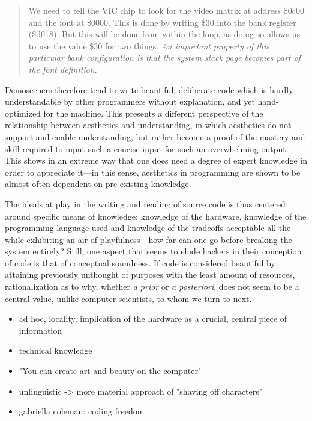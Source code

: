 \begin{quote}
  We need to tell the VIC chip to look for the video matrix at address \$0c00 and the font at \$0000. This is done by writing \$30 into the bank register (\$d018). But this will be done from within the loop, as doing so allows us to use the value \$30 for two things. \emph{An important property of this particular bank configuration is that the system stack page becomes part of the font definition}.
\end{quote}

Demosceners therefore tend to write beautiful, deliberate code which is hardly understandable by other programmers without explanation, and yet hand-optimized for the machine. This presents a different perspective of the relationship between aesthetics and understanding, in which aesthetics do not support and enable understanding, but rather become a proof of the mastery and skill required to input such a concise input for such an overwhelming output. This shows in an extreme way that one does need a degree of expert knowledge in order to appreciate it—in this sense, aesthetics in programming are shown to be almost often dependent on pre-existing knowledge.

\vspace*{1\baselineskip}

The ideals at play in the writing and reading of source code is thus centered around specific means of knowledge: knowledge of the hardware, knowledge of the programming language used and knowledge of the tradeoffs acceptable all the while exhibiting an air of playfulness—how far can one go before breaking the system entirely? Still, one aspect that seems to elude hackers in their conception of code is that of conceptual soundness. If code is considered beautiful by attaining previously unthought of purposes with the least amount of resources, rationalization as to why, whether \emph{a prior} or \emph{a posteriori}, does not seem to be a central value, unlike computer scientists, to whom we turn to next.

\vspace*{2\baselineskip}

\begin{itemize}
    \item ad hoc, locality, implication of the hardware as a crucial, central piece of information
    \item technical knowledge
    \item "You can create art and beauty on the computer"
    \item unlinguistic -> more material approach of "shaving off characters"
    \item gabriella coleman: coding freedom
\end{itemize}

